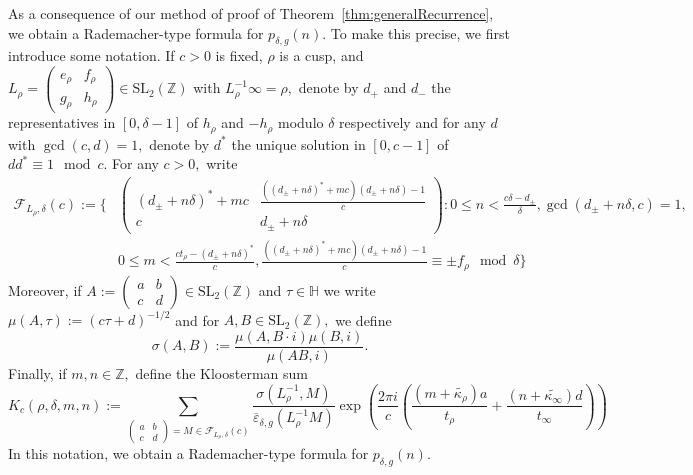 \documentclass[10pt]{amsart}
\theoremstyle{definition}
\theoremstyle{remark}
\numberwithin{equation}{section}
\newcommand{\HH}{\mathbb H}
\newcommand{\SL}{\mathrm{SL}}
\newcommand{\Z}{\mathbb Z}
\begin{document}
	As a consequence of our method of proof of Theorem~\ref{thm:generalRecurrence}, we obtain a Rademacher-type formula for $p_{\delta,g}(n).$ To make this precise, we first introduce some notation. If $c>0$ is fixed, $\rho$ is a cusp, and $L_\rho=\begin{pmatrix}
		e_\rho & f_\rho \\
		g_\rho & h_\rho
	\end{pmatrix}\in\SL_2(\Z)$ with $L_\rho^{-1}\infty=\rho,$ denote by $d_+$ and $d_{-}$ the representatives in $[0,\delta-1]$ of $h_\rho$ and $-h_\rho$ modulo $\delta$ respectively and for any $d$ with $\gcd(c,d)=1,$ denote by $d^\ast$ the unique solution in $[0,c-1]$ of $dd^\ast\equiv 1\mod c$. For any $c>0,$  write
		\begin{align}\label{eq:FLCDef}
		\mathcal{F}_{L_\rho,\delta}(c):=\Bigg\{&\begin{pmatrix}
			(d_{\pm}+n\delta)^\ast + mc & \frac{	((d_{\pm}+n\delta)^\ast + mc)(d_{\pm}+n\delta) - 1}{c} \\
			c & d_{\pm}+n\delta
		\end{pmatrix} : 0\leq n < \frac{c\delta-d_\pm}{\delta}, \gcd(d_\pm+n\delta,c)=1, \\
		&0\leq m < \frac{ct_\rho-(d_{\pm}+n\delta)^\ast}{c}, \frac{((d_{\pm}+n\delta)^\ast + mc)(d_{\pm}+n\delta) - 1}{c}\equiv \pm f_\rho\mod\delta \Bigg\}
	\end{align}
	Moreover, if $A:=\begin{pmatrix}
		a & b \\
		c & d
	\end{pmatrix}\in\SL_2(\Z)$ and $\tau\in\HH$ we write 
	$\mu\left(A,\tau\right):=(c\tau+d)^{-1/2}$ and for $A,B\in\SL_2(\Z),$ we define
	$$
	\sigma(A,B):=\frac{\mu(A,B\cdot i)\mu(B,i)}{\mu(AB,i)}.
	$$
	Finally, if $m,n\in\Z,$ define the Kloosterman sum
	$$
	K_c(\rho,\delta,m,n):=\sum\limits_{\begin{pmatrix}
			a & b \\ c & d
		\end{pmatrix}=M\in\mathcal{F}_{L_\rho,\delta}(c)} \frac{\sigma(L_\rho^{-1},M)}{\overline{\varepsilon}_{\delta,g}(L_\rho^{-1}M)}\exp\left(\frac{2\pi i}{c}\left(\frac{(m+\widetilde{\kappa_\rho})a}{t_\rho}+\frac{(n+\widetilde{\kappa_\infty})d}{t_\infty}\right)\right)
	$$
	In this notation, we obtain a Rademacher-type formula for $p_{\delta,g}(n).$ 
	
\end{document}
